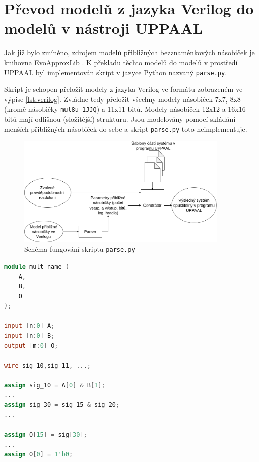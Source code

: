 \section{Převod modelů z jazyka Verilog do modelů v nástroji UPPAAL} \label{parser}
Jak již bylo zmíněno, zdrojem modelů přibližných bezznaménkových násobiček je knihovna EvoApproxLib \cite{circuit_library}. K překladu těchto modelů do modelů v prostředí UPPAAL byl implementován skript v jazyce Python nazvaný \texttt{parse.py}.

Skript je schopen přeložit modely z jazyka Verilog ve formátu zobrazeném ve výpise \ref{lst:verilog}. Zvládne tedy přeložit všechny modely násobiček 7x7, 8x8 (kromě násobičky \texttt{mul8u\_1JJQ}) a 11x11 bitů. Modely násobiček 12x12 a 16x16 bitů mají odlišnou (složitější) strukturu. Jsou modelovány pomocí skládání menších přibližných násobiček do sebe a skript \texttt{parse.py} toto neimplementuje.

\begin{figure}[H]
    \centering
    \includegraphics[width=0.9\textwidth]{obrazky-figures/parser_diagram.png}
    \caption{Schéma fungování skriptu \texttt{parse.py}}
    \label{fig:parser_diagram}
\end{figure}

\begin{lstlisting}[language={Verilog}, caption={Příklad platného formátu modelu násobičky v jazyce Verilog}, label={lst:verilog}]
module mult_name (
    A,
    B,
    O
);

input [n:0] A;
input [n:0] B;
output [m:0] O;

wire sig_10,sig_11, ...;

assign sig_10 = A[0] & B[1];
...
assign sig_30 = sig_15 & sig_20;
...

assign O[15] = sig[30];
...
assign O[0] = 1'b0;
\end{lstlisting}

